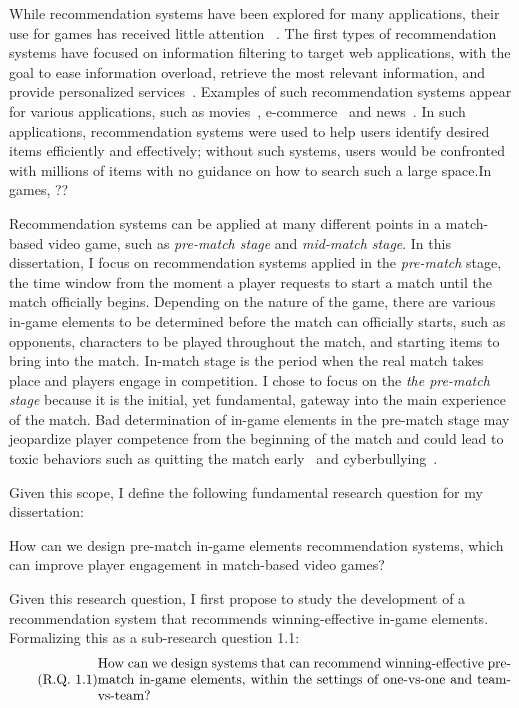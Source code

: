 While recommendation systems have been explored for many applications, their use for games has received little attention ~\cite{kolen2018horizontal,wu2017recommendation}. The first types of recommendation systems have focused on information filtering to target web applications, with the goal to ease information overload, retrieve the most relevant information, and provide personalized services~\cite{isinkaye2015recommendation,bobadilla2013recommender,resnick1997recommender,adomavicius2005toward}. Examples of such recommendation systems appear for various applications, such as movies~\cite{amatriain2012netflix}, e-commerce~\cite{linden2003amazon} and news~\cite{das2007google}. In such applications, recommendation systems were used to help users identify desired items efficiently and effectively; without such systems, users would be confronted with millions of items with no guidance on how to search such a large space.In games, ?? 

Recommendation systems can be applied at many different points in a match-based video game, such as \textit{pre-match stage} and \textit{mid-match stage}. In this dissertation, I focus on recommendation systems applied in the \textit{pre-match} stage, the time window from the moment a player requests to start a match until the match officially begins. Depending on the nature of the game, there are various in-game elements to be determined before the match can officially starts, such as opponents, characters to be played throughout the match, and starting items to bring into the match. In-match stage is the period when the real match takes place and players engage in competition. I chose to focus on the \textit{the pre-match stage} because it is the initial, yet fundamental, gateway into the main experience of the match. Bad determination of in-game elements in the pre-match stage may jeopardize player competence from the beginning of the match and could lead to toxic behaviors such as quitting the match early~\cite{shores2014identification} and cyberbullying~\cite{kwak2015exploring}. 

Given this scope, I define the following fundamental research question for my dissertation:

\begin{displayquote}
How can we design pre-match in-game elements recommendation systems, which can improve player engagement in match-based video games?
\end{displayquote}


Given this research question, I first propose to study the development of a recommendation system that recommends winning-effective in-game elements. Formalizing this as a sub-research question 1.1: 
\begin{equation}
  \tag{R.Q. 1.1}\label{rq1}
  \parbox{\dimexpr\linewidth-4em}{%
    \strut
    How can we design systems that can recommend winning-effective pre-match in-game elements, within the settings of one-vs-one and team-vs-team?
    \strut
  }
\end{equation}

